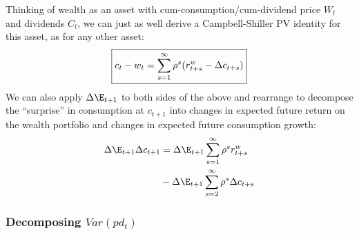 \documentclass[12pt]{article}
\theoremstyle{plain}
\theoremstyle{definition}
\theoremstyle{remark}
\begin{document}
\begin{multicols*}{2}
Thinking of wealth as an asset with cum-consumption/cum-dividend price
$W_t$ and dividends $C_t$, we can just as well derive a Campbell-Shiller
PV identity for this asset, as for any other asset:
\begin{align}
  \boxed{%
  c_t-w_t
  = \sum_{s=1}^\infty \rho^s (r^w_{t+s}-\Delta c_{t+s})
  }
  \label{wcidentityinf}
\end{align}
We can also apply $\Delta\E_{t+1}$ to both sides of the above and
rearrange to decompose the ``surprise'' in consumption at $c_{t+1}$ into
changes in expected future return on the wealth portfolio and changes in
expected future consumption growth:
\begin{align}
  \Delta \E_{t+1}\Delta c_{t+1}
  &=
  \Delta \E_{t+1}\sum_{s=1}^\infty \rho^s r^w_{t+s}
  \notag
  \\
  &- \Delta \E_{t+1}\sum_{s=2}^\infty \rho^s \Delta c_{t+s}
  \label{csurprise}
\end{align}



\columnbreak
\subsubsection{Decomposing $Var(pd_t)$}
\label{sec:decompvar}


\end{multicols*}
\end{document}
